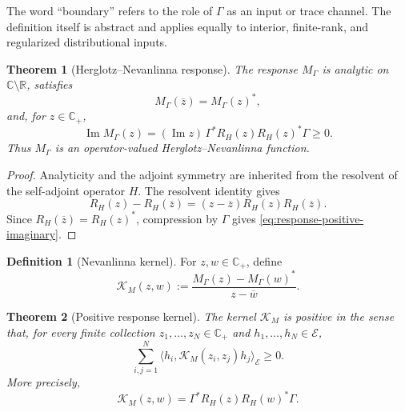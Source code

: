 \documentclass[11pt,reqno]{scrartcl}
\newcommand{\CC}{\mathbb C}
\newcommand{\RR}{\mathbb R}
\newcommand{\inner}[2]{\langle #1,#2\rangle}
\newcommand{\scrE}{\mathscr E}
\newcommand{\Mresp}{M_{\Gamma}}
\newcommand{\KM}{\mathcal K_{M}}
\newcommand{\Cplus}{\mathbb C_{+}}
\theoremstyle{plain}
\newtheorem{theorem}{Theorem}[section]
\theoremstyle{definition}
\newtheorem{definition}[definition]{Definition}
\theoremstyle{remark}
\begin{document}
The word ``boundary'' refers to the role of \(\Gamma\) as an input or trace
channel.  The definition itself is abstract and applies equally to interior,
finite-rank, and regularized distributional inputs.

\begin{theorem}[Herglotz--Nevanlinna response]
\label{thm:response-Herglotz}
The response \(\Mresp\) is analytic on \(\CC\setminus\RR\), satisfies
\begin{equation}
  \Mresp(\overline z)=\Mresp(z)^*,
  \label{eq:response-symmetry}
\end{equation}
and, for \(z\in\Cplus\),
\begin{equation}
  \boxed{
  \operatorname{Im}\Mresp(z)
  =(\operatorname{Im}z)\,
  \Gamma^*R_H(z)R_H(z)^*\Gamma
  \geq0.}
  \label{eq:response-positive-imaginary}
\end{equation}
Thus \(\Mresp\) is an operator-valued Herglotz--Nevanlinna function.
\end{theorem}

\begin{proof}
Analyticity and the adjoint symmetry are inherited from the resolvent of the
self-adjoint operator \(H\).  The resolvent identity gives
\begin{equation}
  R_H(z)-R_H(\overline z)
  =(z-\overline z)R_H(z)R_H(\overline z).
\end{equation}
Since \(R_H(\overline z)=R_H(z)^*\), compression by \(\Gamma\) gives
\eqref{eq:response-positive-imaginary}.
\end{proof}

\begin{definition}[Nevanlinna kernel]
\label{def:Nevanlinna-kernel}
For \(z,w\in\Cplus\), define
\begin{equation}
  \KM(z,w)
  :=\frac{\Mresp(z)-\Mresp(w)^*}{z-\overline w}.
  \label{eq:Nevanlinna-kernel}
\end{equation}
\end{definition}

\begin{theorem}[Positive response kernel]
\label{thm:positive-response-kernel}
The kernel \(\KM\) is positive in the sense that, for every finite collection
\(z_1,\ldots,z_N\in\Cplus\) and \(h_1,\ldots,h_N\in\scrE\),
\begin{equation}
  \sum_{i,j=1}^{N}
  \inner{h_i}{\KM(z_i,z_j)h_j}_{\scrE}\geq0.
  \label{eq:Nevanlinna-kernel-positive}
\end{equation}
More precisely,
\begin{equation}
  \boxed{
  \KM(z,w)=\Gamma^*R_H(z)R_H(w)^*\Gamma.}
  \label{eq:Nevanlinna-kernel-factor}
\end{equation}
\end{theorem}
\end{document}
